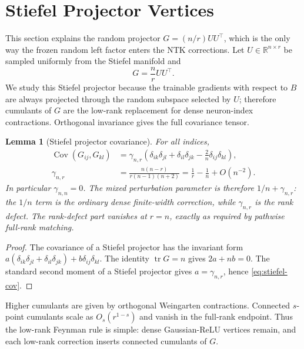 \documentclass{article}
\newtheorem{lemma}[theorem]{Lemma}
\newcommand{\R}{\mathbb R}
\newcommand{\Cov}{\operatorname{Cov}}
\newcommand{\tr}{\operatorname{tr}}
\begin{document}
\section{Stiefel Projector Vertices}
\label{sec:stiefel-projector-vertices}
This section explains the random projector \(G=(n/r)UU^\top\), which is the only way the frozen random left factor enters the NTK corrections.
Let \(U\in\R^{n\times r}\) be sampled uniformly from the Stiefel manifold and
\begin{equation}
G=\frac nr UU^\top.
\label{eq:projector-G}
\end{equation}
We study this Stiefel projector because the trainable gradients with respect to \(B\) are always projected through the random subspace selected by \(U\); therefore cumulants of \(G\) are the low-rank replacement for dense neuron-index contractions. Orthogonal invariance gives the full covariance tensor.

\begin{lemma}[Stiefel projector covariance]
\label{lem:stiefel-cov}
For all indices,
\begin{equation}
\begin{aligned}
\Cov(G_{ij},G_{kl})
&=\gamma_{n,r}\left(\delta_{ik}\delta_{jl}+\delta_{il}\delta_{jk}
-\frac2n\delta_{ij}\delta_{kl}\right),\\
\gamma_{n,r}
&=\frac{n(n-r)}{r(n-1)(n+2)}
=\frac1r-\frac1n+O(n^{-2}).
\end{aligned}
\label{eq:stiefel-cov}
\end{equation}
In particular \(\gamma_{n,n}=0\). The mixed perturbation parameter is therefore \(1/n+\gamma_{n,r}\): the \(1/n\) term is the ordinary dense finite-width correction, while \(\gamma_{n,r}\) is the rank defect. The rank-defect part vanishes at \(r=n\), exactly as required by pathwise full-rank matching.
\end{lemma}

\begin{proof}
The covariance of a Stiefel projector has the invariant form \(a(\delta_{ik}\delta_{jl}+\delta_{il}\delta_{jk})+b\delta_{ij}\delta_{kl}\). The identity \(\tr G=n\) gives \(2a+nb=0\). The standard second moment of a Stiefel projector gives \(a=\gamma_{n,r}\), hence \eqref{eq:stiefel-cov}.
\end{proof}

Higher cumulants are given by orthogonal Weingarten contractions. Connected \(s\)-point cumulants scale as \(O_s(r^{1-s})\) and vanish in the full-rank endpoint. Thus the low-rank Feynman rule is simple: dense Gaussian-ReLU vertices remain, and each low-rank correction inserts connected cumulants of \(G\).
\end{document}
